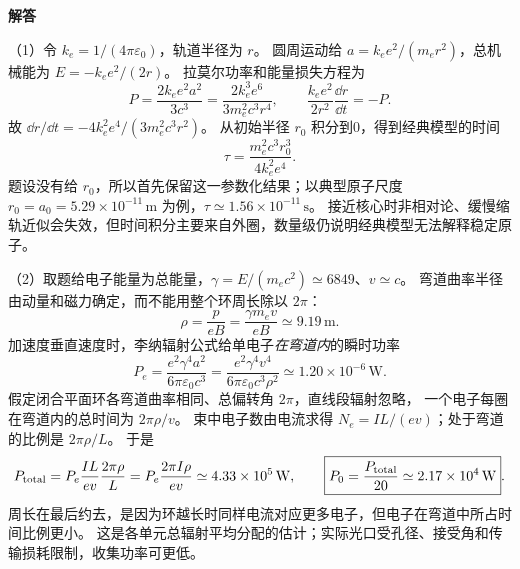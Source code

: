 \begin{advsolution}
\begin{center}\begin{minipage}{.96\linewidth}\centering
\raggedright{\bfseries\color{DeepBlue}解答}\par\smallskip\centering

\label{advA6:quality:A6-source-more:a2}
\end{minipage}\end{center}

（1）令 $k_e=1/(4\pi\varepsilon_0)$，轨道半径为 $r$。
圆周运动给 $a=k_e e^2/(m_er^2)$，总机械能为 $E=-k_e e^2/(2r)$。
拉莫尔功率和能量损失方程为
\[
 P=\frac{2k_e e^2a^2}{3c^3}
 =\frac{2k_e^3e^6}{3m_e^2c^3r^4},\qquad
 \frac{k_e e^2}{2r^2}\frac{\dd r}{\dd t}=-P.
\]
故 $\dd r/\dd t=-4k_e^2e^4/(3m_e^2c^3r^2)$。
从初始半径 $r_0$ 积分到0，得到经典模型的时间
\[
 \boxed{\tau=\frac{m_e^2c^3r_0^3}{4k_e^2e^4}}.
\]
题设没有给 $r_0$，所以首先保留这一参数化结果；以典型原子尺度
$r_0=a_0=5.29\times10^{-11}\,\mathrm m$ 为例，$\tau\simeq1.56\times10^{-11}\,\mathrm s$。
接近核心时非相对论、缓慢缩轨近似会失效，但时间积分主要来自外圈，数量级仍说明经典模型无法解释稳定原子。

（2）取题给电子能量为总能量，$\gamma=E/(m_ec^2)\simeq6849$、$v\simeq c$。
弯道曲率半径由动量和磁力确定，而不能用整个环周长除以 $2\pi$：
\[
 \rho=\frac{p}{eB}=\frac{\gamma m_ev}{eB}\simeq9.19\,\mathrm m.
\]
加速度垂直速度时，李纳辐射公式给单电子\emph{在弯道内}的瞬时功率
\[
 P_e=\frac{e^2\gamma^4a^2}{6\pi\varepsilon_0c^3}
 =\frac{e^2\gamma^4v^4}{6\pi\varepsilon_0c^3\rho^2}
 \simeq1.20\times10^{-6}\,\mathrm W.
\]
假定闭合平面环各弯道曲率相同、总偏转角 $2\pi$，直线段辐射忽略，
一个电子每圈在弯道内的总时间为 $2\pi\rho/v$。
束中电子数由电流求得 $N_e=IL/(ev)$；处于弯道的比例是 $2\pi\rho/L$。
于是
\[
 P_{\rm total}=P_e\frac{IL}{ev}\frac{2\pi\rho}{L}
 =P_e\frac{2\pi I\rho}{ev}\simeq4.33\times10^5\,\mathrm W,
 \qquad
 \boxed{P_0=\frac{P_{\rm total}}{20}\simeq2.17\times10^4\,\mathrm W}.
\]
周长在最后约去，是因为环越长时同样电流对应更多电子，但电子在弯道中所占时间比例更小。
这是各单元总辐射平均分配的估计；实际光口受孔径、接受角和传输损耗限制，收集功率可更低。


\end{advsolution}
